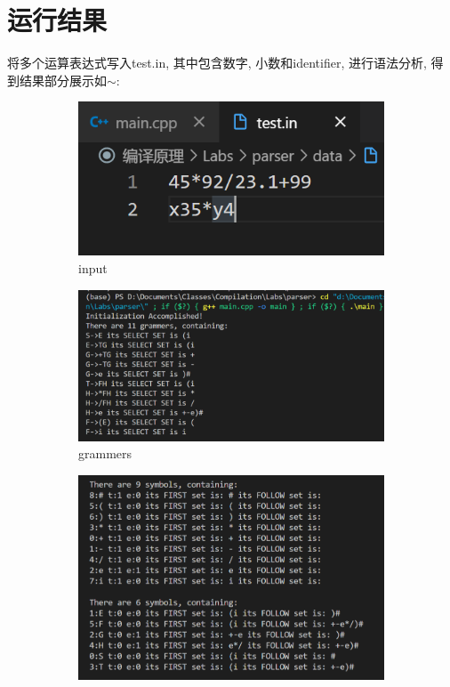 \documentclass{zpt}
\begin{document}
    \section{运行结果}
    将多个运算表达式写入test.in, 其中包含数字, 小数和identifier, 进行语法分析, 得到结果部分展示如$\sim$:
    \begin{figure}[H]
        \centering
        \begin{subfigure}[b]{0.45\textwidth}
            \includegraphics[width=\textwidth]{../resources/input.png}
            \caption{input}
            \label{fig::input}
        \end{subfigure}
        \begin{subfigure}[b]{0.45\textwidth}
            \includegraphics[width=\textwidth]{../resources/grammers.png}
            \caption{grammers}
            \label{fig::grammer}
        \end{subfigure}
        \begin{subfigure}[b]{0.4\textwidth}
            \includegraphics[width=\textwidth]{../resources/symbols.png}

\end{subfigure}
\end{figure}
\end{document}
